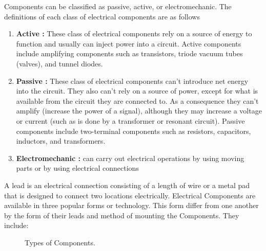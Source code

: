 Components can be classified as passive, active, or electromechanic. The definitions of each class of electrical components are as follows
\begin{enumerate}
\item \textbf{Active :} These class of electrical components rely on a source of energy to function and usually can inject power into a circuit. Active components include amplifying components such as transistors, triode vacuum tubes (valves), and tunnel diodes.
\item \textbf{Passive :} These class of electrical components can't introduce net energy into the circuit. They also can't rely on a source of power, except for what is available from the  circuit they are connected to. As a consequence they can't amplify (increase the power of a signal), although they may increase a voltage or current (such as is done by a transformer or resonant circuit). Passive components include two-terminal components such as resistors, capacitors, inductors, and transformers.
\item \textbf{Electromechanic :}  can carry out electrical operations by using moving parts or by using electrical connections
\end{enumerate}

A lead  is an electrical connection consisting of a length of wire or a metal pad that is designed to connect two locations electrically. Electrical Components are available in three popular forms or technology. This form differ from one another by the form of their leads and method of mounting the Components. They include:



\begin{figure}[p]
\begin{center}
\end{center}

\caption{Types of Components.}
\label{fig:smd_and_tht}
\end{figure}

